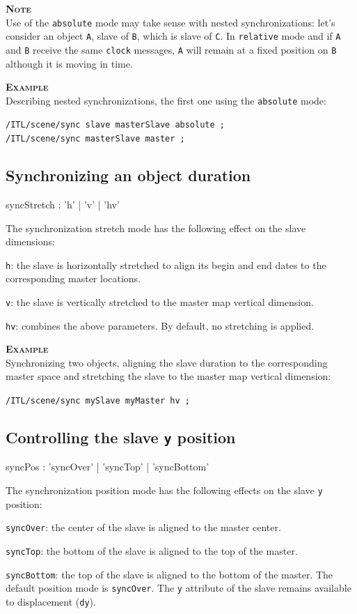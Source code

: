 \documentclass[a4paper,twoside]{report}
\newcommand{\subsublevel}[1]	{\subsection{#1}}
\newcommand{\OSC}[1]		{\texttt{#1}}
\newcommand{\values}[1]		{\texttt{#1}}
\newcommand{\example}		{\textbf{\hspace{-1.5cm}\textbf{\textsc{Example }}}}
\newcommand{\note}	[1]		{\vspace{2mm}\textbf{\hspace{-1.03cm}\textbf{\textsc{Note #1}}}}
\let\olditemize\itemize
\let\oldenditemize\enditemize
\renewenvironment{itemize} 	{\olditemize \setlength{\itemsep}{1mm}}{\oldenditemize}
\newcommand{\sample}	[1]			{\vspace{-2mm}\begin{center}\colorbox{mygrey}{
								\begin{minipage}[t]{0.9\columnwidth} 
								{\small \texttt{#1}}
								\end{minipage}}\end{center}}
\begin{document}
\note{} \\
Use of the \OSC{absolute} mode may take sense with nested synchronizations: let's consider an object \values{A}, slave of \values{B}, which is slave of \values{C}.
In \OSC{relative} mode and if \values{A} and \values{B} receive the same \OSC{clock} messages, \values{A} will remain at a fixed position on \values{B} although it is moving in time.

\example \\
Describing nested synchronizations, the first one using the \OSC{absolute} mode:
\sample{/ITL/scene/sync slave masterSlave absolute ;\\
/ITL/scene/sync masterSlave master ;
}

\subsublevel{Synchronizing an object duration}

\begin{rail}
syncStretch : 'h' | 'v' | 'hv'
\end{rail}

The synchronization stretch mode has the following effect on the slave dimensions:
\begin{itemize}
\item \OSC{h}: the slave is horizontally stretched to align its begin and end dates to the corresponding master locations.
\item \OSC{v}: the slave is vertically stretched to the master map vertical dimension.
\item \OSC{hv}: combines the above parameters.
\end{itemize}
By default, no stretching is applied.

\example \\
Synchronizing two objects, aligning the slave duration to the corresponding master space and stretching the slave to the master map vertical dimension:
\sample{/ITL/scene/sync mySlave myMaster hv ;}


\subsublevel{Controlling the slave \OSC{y} position}

\begin{rail}
syncPos : 'syncOver' | 'syncTop' | 'syncBottom'
\end{rail}

The synchronization position mode has the following effects on the slave \values{y} position:
\begin{itemize}
\item \OSC{syncOver}: the center of the slave is aligned to the master center.
\item \OSC{syncTop}: the bottom of the slave is aligned to the top of the master.
\item \OSC{syncBottom}: the top of the slave is aligned to the bottom of the master.
\end{itemize}
The default position mode is \OSC{syncOver}. The \OSC{y} attribute of the slave remains available to displacement (\OSC{dy}). 
\end{document}
